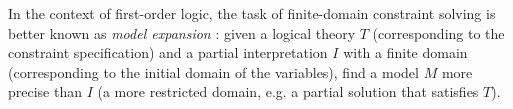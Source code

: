 In the context of first-order logic, the task of finite-domain constraint solving is better known as \emph{model expansion} \cite{MitchellTHM06}: given a logical theory $T$ (corresponding to the constraint specification) and a partial interpretation $I$ with a finite domain (corresponding to the initial domain of the variables), find a model $M$ more precise than $I$ (a more restricted domain, e.g. a partial solution that satisfies $T$).

% 
% 
